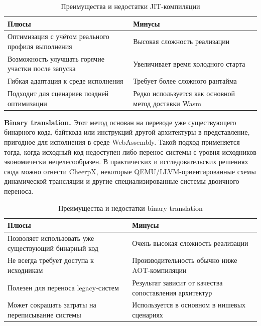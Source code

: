 \begin{table}[htbp]
\centering
\scriptsize
\renewcommand{\arraystretch}{1.15}
\begin{tabular}{|p{5.8cm}|p{5.8cm}|}
\hline
\textbf{Плюсы} & \textbf{Минусы} \\
\hline
Оптимизация с учётом реального профиля выполнения & Высокая сложность реализации \\
\hline
Возможность улучшать горячие участки после запуска & Увеличивает время холодного старта \\
\hline
Гибкая адаптация к среде исполнения & Требует более сложного рантайма \\
\hline
Подходит для сценариев поздней оптимизации & Редко используется как основной метод доставки Wasm \\
\hline
\end{tabular}
\caption{Преимущества и недостатки JIT-компиляции}
\label{tab:jit_pros_cons}
\end{table}

    \quad \textbf{Binary translation.} Этот метод основан на переводе уже существующего бинарного кода, байткода или инструкций другой архитектуры в представление, пригодное для исполнения в среде WebAssembly. Такой подход применяется тогда, когда исходный код недоступен либо перенос системы с уровня исходников экономически нецелесообразен. В практических и исследовательских решениях сюда можно отнести CheerpX, некоторые QEMU/LLVM-ориентированные схемы динамической трансляции и другие специализированные системы двоичного переноса.

\begin{table}[htbp]
\centering
\scriptsize
\renewcommand{\arraystretch}{1.15}
\begin{tabular}{|p{5.8cm}|p{5.8cm}|}
\hline
\textbf{Плюсы} & \textbf{Минусы} \\
\hline
Позволяет использовать уже существующий бинарный код & Очень высокая сложность реализации \\
\hline
Не всегда требует доступа к исходникам & Производительность обычно ниже AOT-компиляции \\
\hline
Полезен для переноса legacy-систем & Результат зависит от качества сопоставления архитектур \\
\hline
Может сокращать затраты на переписывание системы & Используется в основном в нишевых сценариях \\
\hline
\end{tabular}
\caption{Преимущества и недостатки binary translation}
\label{tab:binary_translation_pros_cons}
\end{table}

